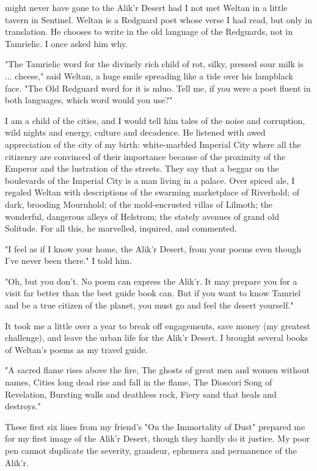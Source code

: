 
 might never have gone to the Alik'r Desert had I not met Weltan in a little tavern in Sentinel. Weltan is a Redguard poet whose verse I had read, but only in translation. He chooses to write in the old language of the Redguards, not in Tamrielic. I once asked him why.

"The Tamrielic word for the divinely rich child of rot, silky, pressed sour milk is ... cheese," said Weltan, a huge smile spreading like a tide over his lampblack face. "The Old Redguard word for it is mluo. Tell me, if you were a poet fluent in both languages, which word would you use?"

I am a child of the cities, and I would tell him tales of the noise and corruption, wild nights and energy, culture and decadence. He listened with awed appreciation of the city of my birth: white-marbled Imperial City where all the citizenry are convinced of their importance because of the proximity of the Emperor and the lustration of the streets. They say that a beggar on the boulevards of the Imperial City is a man living in a palace. Over spiced ale, I regaled Weltan with descriptions of the swarming marketplace of Riverhold; of dark, brooding Mournhold; of the mold-encrusted villas of Lilmoth; the wonderful, dangerous alleys of Helstrom; the stately avenues of grand old Solitude. For all this, he marvelled, inquired, and commented.

"I feel as if I know your home, the Alik'r Desert, from your poems even though I've never been there." I told him.

"Oh, but you don't. No poem can express the Alik'r. It may prepare you for a visit far better than the best guide book can. But if you want to know Tamriel and be a true citizen of the planet, you must go and feel the desert yourself."

It took me a little over a year to break off engagements, save money (my greatest challenge), and leave the urban life for the Alik'r Desert. I brought several books of Weltan's poems as my travel guide.

"A sacred flame rises above the fire, The ghosts of great men and women without names, Cities long dead rise and fall in the flame, The Dioscori Song of Revelation, Bursting walls and deathless rock, Fiery sand that heals and destroys."

These first six lines from my friend's "On the Immortality of Dust" prepared me for my first image of the Alik'r Desert, though they hardly do it justice. My poor pen cannot duplicate the severity, grandeur, ephemera and permanence of the Alik'r.

